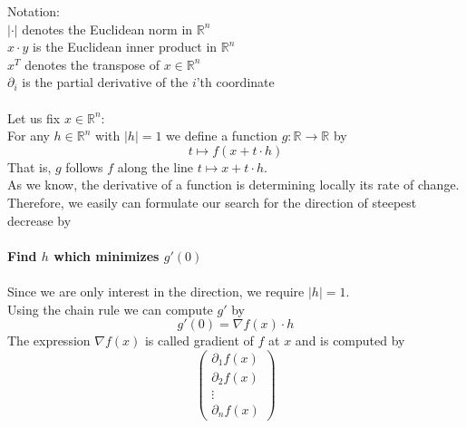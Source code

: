 \documentclass[17pt]{extarticle}
\begin{document}
Notation: \\
$|\cdot|$ denotes the Euclidean norm in $\mathbb{R}^{n}$\\
$x\cdot y$ is the Euclidean inner product in $\mathbb{R}^{n}$\\
$x^T$ denotes the transpose of $x\in\mathbb{R}^n$\\
$\partial_{i}$ is the partial derivative of the $i$'th coordinate\\
\\
Let us fix $x\in\mathbb{R}^{n}$:
\\
For any $h\in\mathbb{R}^{n}$ with $|h|=1$
we define a function $g:\mathbb{R}\rightarrow\mathbb{R}$ by
$$
t\mapsto f(x+t\cdot h)
$$
That is, $g$ follows $f$ along the line $t\mapsto x+t\cdot h$.\\
As we know, the derivative of a function is determining locally its rate of change. Therefore, we easily can formulate our search for the direction of steepest decrease by \\
\\
\textbf{Find $h$ which minimizes $g'(0)$}\\
\\
Since we are only interest in the direction, we require $|h|=1$.\\
Using the chain rule we can compute $g'$ by
$$
g'(0)=\nabla f(x)\cdot h
$$
The expression $\nabla f(x)$ is called gradient of $f$ at $x$ and is computed by
 $$
 \begin{pmatrix}
 \partial_1 f(x)\\
  \partial_2 f(x)\\
   \vdots\\
 \partial_n f(x)
 \end{pmatrix}
 $$
\end{document}
